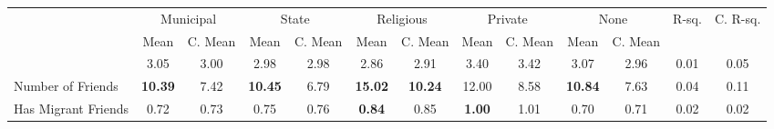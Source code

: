 \begin{tabular}{l c c c c c c c c c c c c}
\toprule
& \multicolumn{2}{c}{Municipal} & \multicolumn{2}{c}{State} & \multicolumn{2}{c}{Religious} & \multicolumn{2}{c}{Private} & \multicolumn{2}{c}{None} & R-sq. & C. R-sq. \\
& \scriptsize Mean & \scriptsize C. Mean & \scriptsize Mean & \scriptsize C. Mean & \scriptsize Mean & \scriptsize C. Mean & \scriptsize Mean & \scriptsize C. Mean & \scriptsize Mean & \scriptsize C. Mean & & \\
\midrule
&      3.05 & 3.00 &      2.98 & 2.98 &      2.86 & 2.91 &      3.40 & 3.42 &      3.07 & 2.96 &      0.01 &      0.05 \\
Number of Friends & \textbf{    10.39} & 7.42 & \textbf{    10.45} & 6.79 & \textbf{    15.02} & \textbf{    10.24} &     12.00 & 8.58 & \textbf{    10.84} & 7.63 &      0.04 &      0.11 \\
Has Migrant Friends &      0.72 & 0.73 &      0.75 & 0.76 & \textbf{     0.84} & 0.85 & \textbf{     1.00} & 1.01 &      0.70 & 0.71 &      0.02 &      0.02 \\
\bottomrule
\end{tabular}
